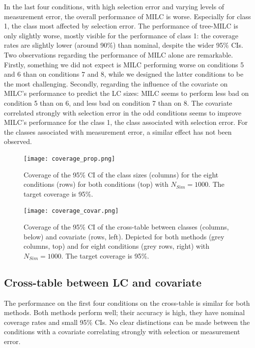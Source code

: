 \documentclass[a4paper, 11pt]{article} %
\begin{document}
In the last four conditions, with high selection error and varying levels of measurement error, the overall performance of MILC is worse. Especially for class 1, the class most affected by selection error. The performance of tree-MILC is only slightly worse, mostly visible for the performance of class 1: the coverage rates are slightly lower (around 90\%) than nominal, despite the wider 95\% CIs. Two observations regarding the performance of MILC alone are remarkable. Firstly, something we did not expect is MILC performing worse on conditions 5 and 6 than on conditions 7 and 8, while we designed the latter conditions to be the most challenging. Secondly, regarding the influence of the covariate on MILC's performance to predict the LC sizes: MILC seems to perform less bad on condition 5 than on 6, and less bad on condition 7 than on 8. The covariate correlated strongly with selection error in the odd conditions seems to improve MILC's performance for the class 1, the class associated with selection error. For the classes associated with measurement error, a similar effect has not been observed.

\begin{figure}[h]
    \centering
    \texttt{[image: coverage\_prop.png]}
     \caption{Coverage of the 95\% CI of the class sizes (columns) for the eight conditions (rows) for both conditions (top) with $N_{Sim} = 1000$. The target coverage is 95\%.} 
     \label{fig:coverageprop}
\end{figure}
\begin{figure}[h]
    \centering 
    \texttt{[image: coverage\_covar.png]}
     \caption{Coverage of the 95\% CI of the cross-table between classes (columns, below) and covariate (rows, left). Depicted for both methods (grey columns, top) and for eight conditions (grey rows, right) with $N_{Sim} = 1000$. The target coverage is 95\%.}
     \label{fig:coveragecovar}
\end{figure}

\subsection{Cross-table between LC and covariate}
The performance on the first four conditions on the cross-table is similar for both methods. Both methods perform well; their accuracy is high, they have nominal coverage rates and small 95\% CIs. No clear distinctions can be made between the conditions with a covariate correlating strongly with selection or measurement error.
\end{document}

